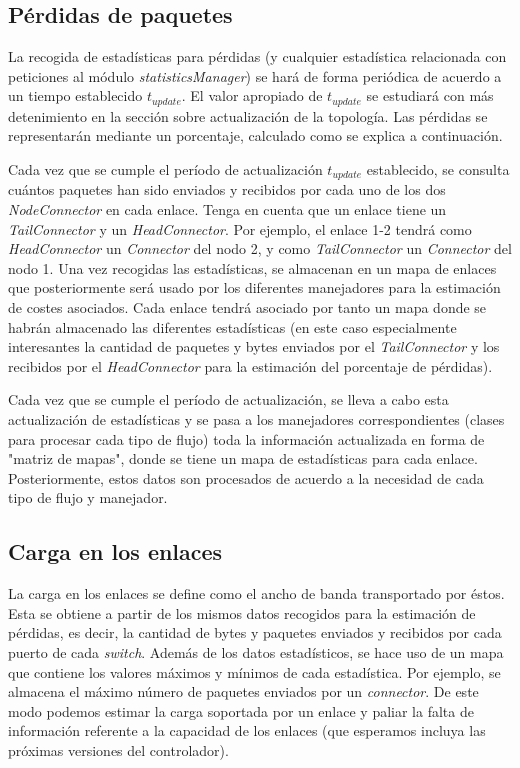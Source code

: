 \documentclass[a4paper,11pt]{book}
\begin{document}
%
\subsection{Pérdidas de paquetes}

La recogida de estadísticas para pérdidas (y cualquier estadística relacionada con peticiones al módulo \textit{statisticsManager}) se hará de forma periódica de acuerdo a un tiempo establecido $t_{update}$. El valor apropiado de $t_{update}$ se estudiará con más detenimiento en la sección sobre actualización de la topología. Las pérdidas se representarán mediante un porcentaje, calculado como se explica a continuación.

Cada vez que se cumple el período de actualización $t_{update}$ establecido, se consulta cuántos paquetes han sido enviados y recibidos por cada uno de los dos \emph{NodeConnector} en cada enlace. Tenga en cuenta que un enlace tiene un \textit{TailConnector} y un \textit{HeadConnector}. Por ejemplo, el enlace 1-2 tendrá como \textit{HeadConnector} un \textit{Connector} del nodo 2, y como \textit{TailConnector} un \textit{Connector} del nodo 1. 
Una vez recogidas las estadísticas, se almacenan en un mapa de enlaces que posteriormente será usado por los diferentes manejadores para la estimación de costes asociados. Cada enlace tendrá asociado por tanto un mapa donde se habrán almacenado las diferentes estadísticas (en este caso especialmente interesantes la cantidad de paquetes y bytes enviados por el \textit{TailConnector} y los recibidos por el \textit{HeadConnector} para la estimación del porcentaje de pérdidas).

Cada vez que se cumple el período de actualización, se lleva a cabo esta actualización de estadísticas y se pasa a los manejadores correspondientes (clases para procesar cada tipo de flujo) toda la información actualizada en forma de "matriz de mapas", donde se tiene un mapa de estadísticas para cada enlace. Posteriormente, estos datos son procesados de acuerdo a la necesidad de cada tipo de flujo y manejador.

\subsection{Carga en los enlaces}
La carga en los enlaces se define como el ancho de banda transportado por éstos. Esta se obtiene a partir de los mismos datos recogidos para la estimación de pérdidas, es decir, la cantidad de bytes y paquetes enviados y recibidos por cada puerto de cada \emph{switch}. Además de los datos estadísticos, se hace uso de un mapa que contiene los valores máximos y mínimos de cada estadística. Por ejemplo, se almacena el máximo número de paquetes enviados por un \textit{connector}. De este modo podemos estimar la carga soportada por un enlace y paliar la falta de información referente a la capacidad de los enlaces (que esperamos incluya las próximas versiones del controlador).
\end{document}
